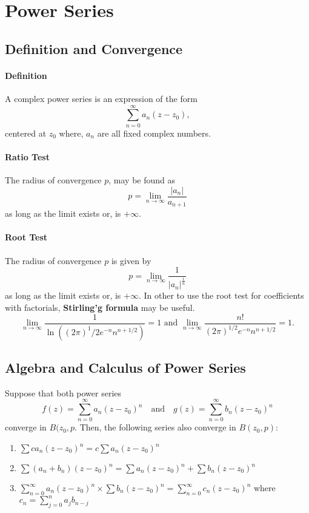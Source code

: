 \documentclass[12pt, letterpaper]{article}
\begin{document}
    
    \section{Power Series}
    \subsection{Definition and Convergence}
    
    \paragraph{Definition}
    A complex power series is an expression of the form
    \[\sum_{n=0}^{\infty} a_n \left( z-z_0\right),\]
    centered at \(z_0\) where, \(a_n\) are all fixed complex numbers.

    \paragraph{Ratio Test}
    The radius of convergence \(p\), may be found as 
    \[p = \lim_{n\to\infty} \frac{|a_n|}{a_{n+1}}\]
    as long as the limit exists or, is \(+\infty\).
    
    \paragraph{Root Test} The radius of convergence \(p\) is given by
    \[p = \lim_{n\to\infty} \frac{1}{|a_n|^\frac{1}{n}}\]
    as long as the limit exists or, is \(+\infty\).
    \newline\indent
    In other to use the root test for coefficients with factorials,
    \textbf{Stirling'g formula} may be useful.
    \[
        \lim_{n\to\infty} \frac{1}{\ln((2\pi)^1/2 e^{-n} n^{n+1/2})} = 1
        \text{ and }
        \lim_{n\to\infty} \frac{n!}{(2\pi)^{1/2} e^{-n} n^{n+1/2}} = 1.
    \] 
   
    \subsection{Algebra and Calculus of Power Series}
    Suppose that both power series
    \[f(z) = \sum_{n=0}^\infty a_n (z-z_0)^n
    \quad \text{and} \quad g(z) = \sum_{n=0}^\infty b_n (z-z_0)^n \]
    converge in \(B(z_0, p\). Then, the following series also converge in 
    \(B(z_0, p)\):
    \begin{enumerate}
        \item \(\sum ca_n(z-z_0)^ n= c\sum a_n(z-z_0)^n\)
        \item \(\sum (a_n + b_n)(z-z_0)^n = \sum a_n(z-z_0)^n + \sum b_n(z-z_0)^n\)
        \item \(\sum_{n=0}^{\infty} a_n(z-z_0)^n \times \sum b_n(z-z_0)^n
        = \sum_{n=0}^{\infty} c_n (z-z_0)^n\) where
        \(c_n = \sum_{j=0}^{n} a_{j} b_{n-j}\)
    \end{enumerate}
\end{document}
